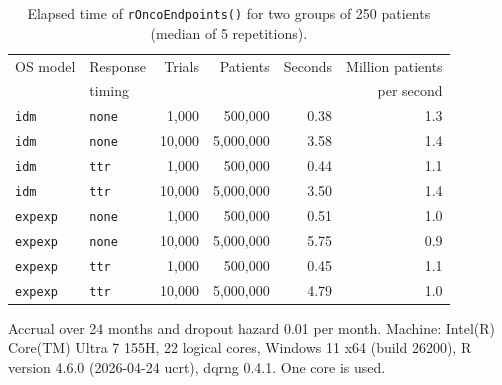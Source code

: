 \begin{table}[htbp]
\centering
\caption{Elapsed time of \texttt{rOncoEndpoints()} for two groups of 250 patients (median of 5 repetitions).}
\label{tab:time}
\begin{threeparttable}
\small
\begin{tabular}{llrrrr}
\toprule
OS model & Response & Trials & Patients & Seconds & Million patients \\
 & timing & & & & per second \\
\midrule
\texttt{idm} & \texttt{none} &  1,000 &   500,000 & 0.38 & 1.3 \\
\texttt{idm} & \texttt{none} & 10,000 & 5,000,000 & 3.58 & 1.4 \\
\texttt{idm} & \texttt{ttr} &  1,000 &   500,000 & 0.44 & 1.1 \\
\texttt{idm} & \texttt{ttr} & 10,000 & 5,000,000 & 3.50 & 1.4 \\
\texttt{expexp} & \texttt{none} &  1,000 &   500,000 & 0.51 & 1.0 \\
\texttt{expexp} & \texttt{none} & 10,000 & 5,000,000 & 5.75 & 0.9 \\
\texttt{expexp} & \texttt{ttr} &  1,000 &   500,000 & 0.45 & 1.1 \\
\texttt{expexp} & \texttt{ttr} & 10,000 & 5,000,000 & 4.79 & 1.0 \\
\bottomrule
\end{tabular}
\begin{tablenotes}
\footnotesize
\item Accrual over 24 months and dropout hazard 0.01 per month. Machine: Intel(R) Core(TM) Ultra 7 155H, 22 logical cores, Windows 11 x64 (build 26200), R version 4.6.0 (2026-04-24 ucrt), dqrng 0.4.1. One core is used.
\end{tablenotes}
\end{threeparttable}
\end{table}
